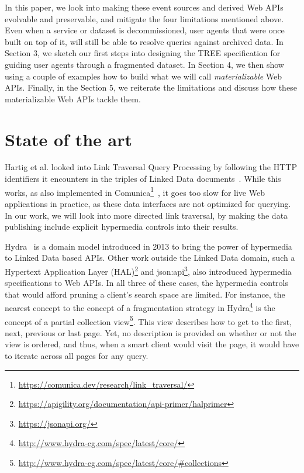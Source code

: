 \documentclass[
]{ceurart}
\begin{document}
In this paper, we look into making these event sources and derived Web APIs evolvable and preservable, and mitigate the four limitations mentioned above.
Even when a service or dataset is decommissioned, user agents that were once built on top of it, will still be able to resolve queries against archived data.
In Section 3, we sketch our first steps into designing the TREE specification for guiding user agents through a fragmented dataset.
In Section 4, we then show using a couple of examples how to build what we will call \textit{materializable} Web APIs.
Finally, in the Section 5, we reiterate the limitations and discuss how these materializable Web APIs tackle them.

\section{State of the art}
\label{sec:sota}
Hartig et al. looked into Link Traversal Query Processing by following the HTTP identifiers it encounters in the triples of Linked Data documents~\cite{hartig2009executing}.
While this works, as also implemented in Comunica\footnote{\url{https://comunica.dev/research/link_traversal/}}~\cite{taelman_iswc_resources_comunica_2018}, it goes too slow for live Web applications in practice, as these data interfaces are not optimized for querying.
In our work, we will look into more directed link traversal, by making the data publishing include explicit hypermedia controls into their results.

Hydra~\cite{lanthaler2013creating} is a domain model introduced in 2013 to bring the power of hypermedia to Linked Data based APIs.
Other work outside the Linked Data domain, such a Hypertext Application Layer (HAL)\footnote{\url{https://apigility.org/documentation/api-primer/halprimer}} and json:api\footnote{\url{https://jsonapi.org/}}, also introduced hypermedia specifications to Web APIs.
In all three of these cases, the hypermedia controls that would afford pruning a client’s search space are limited.
For instance, the nearest concept to the concept of a fragmentation strategy in Hydra\footnote{\url{http://www.hydra-cg.com/spec/latest/core/}} is the concept of a partial collection view\footnote{\url{http://www.hydra-cg.com/spec/latest/core/#collections}}.
This view describes how to get to the first, next, previous or last page.
Yet, no description is provided on whether or not the view is ordered, and thus, when a smart client would visit the page, it would have to iterate across all pages for any query.
\end{document}
